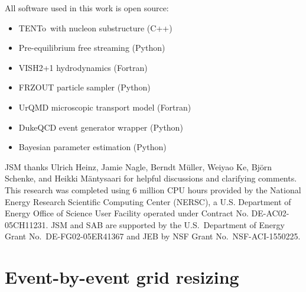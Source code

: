 \documentclass[aps,prc,reprint,amsmath,nofootinbib]{revtex4-1}
\newcommand{\trento}{T\raisebox{-0.5ex}{R}ENTo}
\begin{document}
All software used in this work is open source:
\begin{itemize}[leftmargin=2\parindent, itemsep=0pt, topsep=5pt]
  \item \trento\ with nucleon substructure (C++) \cite{trento:code}
  \item Pre-equilibrium free streaming (Python) \cite{freestream:code}
  \item VISH2+1 hydrodynamics (Fortran) \cite{osuhydro:code}
  \item FRZOUT particle sampler (Python) \cite{frzout:code}
  \item UrQMD microscopic transport model (Fortran) \cite{urqmd:code}
  \item DukeQCD event generator wrapper (Python) \cite{eventgen:code}
  \item Bayesian parameter estimation (Python) \cite{bayesian:code}
\end{itemize}

\medskip

\begin{acknowledgments}
  JSM thanks Ulrich Heinz, Jamie Nagle, Berndt M\"uller, Weiyao Ke, Bj\"orn Schenke, and Heikki M\"antysaari for helpful discussions and clarifying comments.
  This research was completed using 6 million CPU hours provided by the National Energy Research Scientific Computing Center (NERSC), a U.S. Department of Energy Office of Science User Facility operated under Contract No. DE-AC02-05CH11231.
  JSM and SAB are supported by the U.S.\ Department of Energy Grant No.\ DE-FG02-05ER41367 and JEB by NSF Grant No.\ NSF-ACI-1550225.
\end{acknowledgments}



\appendix

\section{Event-by-event grid resizing}
\label{app:adaptive_grid}
\end{document}
